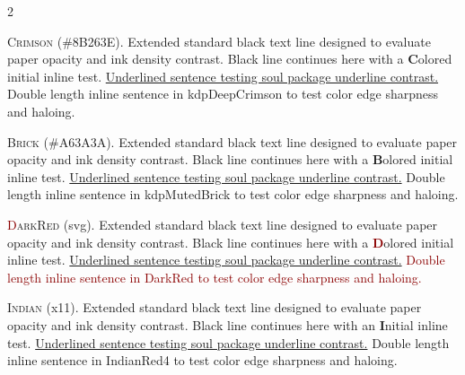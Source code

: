 \documentclass[9pt]{article}
\let\oldlettrine\lettrine
\renewcommand{\lettrine}[3][]{%
	\clubpenalty=10000
	\oldlettrine[#1]{#2}{#3}%
}
\begin{document}
\begin{multicols}{2}


\lettrine[lines=2]{\textcolor{kdpDeepCrimson}{C}}{rimson} (\#8B263E). Extended standard black text line designed to evaluate paper opacity and ink density contrast. Black line continues here with a \textbf{\textcolor{kdpDeepCrimson}{C}}olored initial inline test. \ul{Underlined sentence testing soul package underline contrast.} \textcolor{kdpDeepCrimson}{Double length inline sentence in kdpDeepCrimson to test color edge sharpness and haloing.}
\medskip

\lettrine[lines=2]{\textcolor{kdpMutedBrick}{B}}{rick} (\#A63A3A). Extended standard black text line designed to evaluate paper opacity and ink density contrast. Black line continues here with a \textbf{\textcolor{kdpMutedBrick}{B}}olored initial inline test. \ul{Underlined sentence testing soul package underline contrast.} \textcolor{kdpMutedBrick}{Double length inline sentence in kdpMutedBrick to test color edge sharpness and haloing.}
\medskip

\lettrine[lines=2]{\textcolor{DarkRed}{D}}{arkRed} (svg). Extended standard black text line designed to evaluate paper opacity and ink density contrast. Black line continues here with a \textbf{\textcolor{DarkRed}{D}}olored initial inline test. \ul{Underlined sentence testing soul package underline contrast.} \textcolor{DarkRed}{Double length inline sentence in DarkRed to test color edge sharpness and haloing.}
\medskip

\lettrine[lines=2]{\textcolor{IndianRed4}{I}}{ndian} (x11). Extended standard black text line designed to evaluate paper opacity and ink density contrast. Black line continues here with an \textbf{\textcolor{IndianRed4}{I}}nitial inline test. \ul{Underlined sentence testing soul package underline contrast.} \textcolor{IndianRed4}{Double length inline sentence in IndianRed4 to test color edge sharpness and haloing.}
\medskip


\end{multicols}
\end{document}
